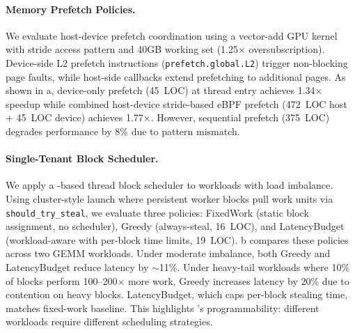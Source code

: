 \paragraph{Memory Prefetch Policies.}
We evaluate host-device prefetch coordination using a vector-add GPU kernel~\cite{nvidia_cuda_samples} with stride access pattern and 40GB working set (1.25$\times$ oversubscription).
Device-side L2 prefetch instructions (\texttt{prefetch.\allowbreak{}global.\allowbreak{}L2}) trigger non-blocking page faults, while host-side callbacks extend prefetching to additional pages.
As shown in a, device-only prefetch (45~LOC) at thread entry achieves 1.34$\times$ speedup while combined host-device stride-based eBPF prefetch (472~LOC host + 45~LOC device) achieves 1.77$\times$.
However, sequential prefetch (375~LOC) degrades performance by 8\% due to pattern mismatch.

\paragraph{Single-Tenant Block Scheduler.}
We apply a \sys-based thread block scheduler to workloads with load imbalance.
Using cluster-style launch where persistent worker blocks pull work units via \texttt{should\_\allowbreak{}try\_steal}, we evaluate three policies: FixedWork (static block assignment, no scheduler), Greedy (always-steal, 16~LOC), and LatencyBudget (workload-aware with per-block time limits, 19~LOC).
b compares these policies across two GEMM workloads.
Under moderate imbalance, both Greedy and LatencyBudget reduce latency by $\sim$11\%.
Under heavy-tail workloads where 10\% of blocks perform 100--200$\times$ more work, Greedy increases latency by 20\% due to contention on heavy blocks.
LatencyBudget, which caps per-block stealing time, matches fixed-work baseline.
This highlights \sys's programmability: different workloads require different scheduling strategies.

